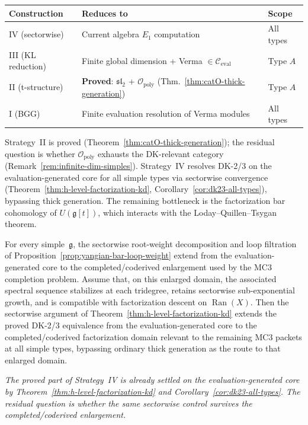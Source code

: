 \begin{remark}
\label{rem:category-O-generation-obstruction}
\begin{center}
\renewcommand{\arraystretch}{1.2}
\begin{tabular}{lll}
\textbf{Construction} & \textbf{Reduces to} & \textbf{Scope} \\
\hline
IV (sectorwise) & Current algebra $E_1$ computation
 & All types \\
III (KL reduction) & Finite global dimension +
 Verma $\in \mathcal{C}_{\mathrm{eval}}$ & Type $A$ \\
II (t-structure) & \textbf{Proved}: $\mathfrak{sl}_2$ + $\mathcal{O}_{\mathrm{poly}}$
 (Thm.~\ref{thm:catO-thick-generation}) & Type $A$ \\
I (BGG) & Finite evaluation resolution of Verma modules
 & All types \\
\end{tabular}
\end{center}
Strategy~II is proved (Theorem~\ref{thm:catO-thick-generation}); the residual question is whether $\mathcal{O}_{\mathrm{poly}}$ exhausts the DK-relevant category (Remark~\ref{rem:infinite-dim-simples}). Strategy~IV resolves DK-2/3 on the evaluation-generated core for all simple types via sectorwise convergence (Theorem~\ref{thm:h-level-factorization-kd}, Corollary~\ref{cor:dk23-all-types}), bypassing thick generation. The remaining bottleneck is the factorization bar cohomology of $U(\mathfrak{g}[t])$, which interacts with the Loday--Quillen--Tsygan theorem.
\end{remark}

\begin{conjecture}\label{conj:mc3-sectorwise-all-types}
For every simple~$\mathfrak{g}$, the sectorwise root-weight
decomposition and loop filtration of
Proposition~\ref{prop:yangian-bar-loop-weight} extend from the
evaluation-generated core to the completed/coderived enlargement
used by the MC3 completion problem. Assume that,
on this enlarged domain, the associated spectral sequence
stabilizes at each tridegree, retains sectorwise sub-exponential
growth, and is compatible with factorization descent on
$\operatorname{Ran}(X)$. Then the sectorwise argument of
Theorem~\textup{\ref{thm:h-level-factorization-kd}} extends the
proved DK-2/3 equivalence from the evaluation-generated core to the
completed/coderived factorization domain relevant to the remaining
MC3 packets at all simple types, bypassing ordinary thick generation
as the route to that enlarged domain.

\emph{The proved part of Strategy~IV is already settled on the
evaluation-generated core by
Theorem~\textup{\ref{thm:h-level-factorization-kd}} and
Corollary~\textup{\ref{cor:dk23-all-types}}. The residual question
is whether the same sectorwise control survives the
completed/coderived enlargement.}
\end{conjecture}

